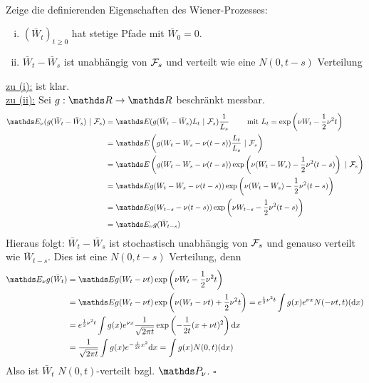 \\
Zeige die definierenden Eigenschaften des Wiener-Prozesses:
\begin{enumerate}[(i)]
	\item $(\bar{W}_t)_{t\ge 0}$ hat stetige Pfade mit $\bar{W}_0=0$.
	\item $\bar{W}_t-\bar{W}_s$ ist unabhängig von $\mathcal{F}_s$ und verteilt wie eine $N(0,t-s)$ Verteilung
\end{enumerate}
\uline{zu (i):}
ist klar.\\
\uline{zu (ii):}
Sei $g:\R\to\R$ beschränkt messbar.
\begin{equation*}
\begin{aligned}
	\E_\nu (g(\bar{W}_t-\bar{W}_s)~|~\F_s) &= \E (g(\bar{W}_t-\bar{W}_s)L_t~|~\F_s)\frac{1}{L_s} \qquad \text{ mit } L_t=\exp\enbrace{\nu W_t-\frac{1}{2}\nu^2t}\\
	&= \E\enbrace{g(W_t-W_s-\nu(t-s))\frac{L_t}{L_s}~|~\F_s}\\
	&= \E\enbrace{g(W_t-W_s-\nu(t-s))\exp\enbrace{\nu(W_t-W_s)-\frac{1}{2}\nu^2(t-s)}~|~\F_s}\\
	&= \E g(W_t-W_s-\nu(t-s))\exp\enbrace{\nu(W_t-W_s)-\frac{1}{2}\nu^2(t-s)}\\
	&= \E g(W_{t-s}-\nu(t-s))\exp\enbrace{\nu W_{t-s}-\frac{1}{2}\nu^2(t-s)}\\
	&= \E_\nu g(\bar{W}_{t-s})
\end{aligned}
\end{equation*}
Hieraus folgt: $\bar{W}_t-\bar{W}_s$ ist stochastisch unabhängig von $\mathcal{F}_s$ und genauso verteilt wie $\bar{W}_{t-s}$.
Dies ist eine $N(0,t-s)$ Verteilung, denn
\begin{equation*}
\begin{aligned}
	\E_\nu g(\bar{W}_t) &= \E g(W_t-\nu t)\exp\enbrace{\nu W_t-\frac{1}{2}\nu^2 t}\\
	&= \E g(W_t-\nu t)\exp\enbrace{\nu (W_t-\nu t)+\frac{1}{2}\nu^2t} = e^{\frac{1}{2}\nu^2t}\int g(x)e^{\nu x}N(-\nu t,t)(\dint x)\\
	&= e^{\frac{1}{2}\nu^2t}\int g(x)e^{\nu x}\frac{1}{\sqrt{2\pi t}}\exp\enbrace{-\frac{1}{2t}(x+\nu t)^2}\dint x\\
	&= \frac{1}{\sqrt{2\pi t}}\int g(x)e^{-\frac{1}{2t}x^2}\dint x = \int g(x)N(0,t)(\dint x)
\end{aligned}
\end{equation*}
Also ist $ \bar{W}_t$ $N(0,t)$-verteilt bzgl. $\Pw_\nu$.
\hfill $\square$

